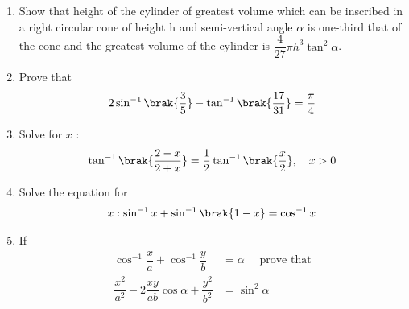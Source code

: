 \begin{enumerate}
    \item Show that height of the cylinder of greatest volume which can be inscribed in a right circular cone of height h and semi-vertical angle $\alpha$ is one-third that of the cone and the greatest volume of the cylinder is $\dfrac{4}{27} \pi h^3 \tan^2 \alpha$.
    \item Prove that
          \begin{align*}
              2\sin^{-1}\brak{\dfrac{3}{5}}-\tan^{-1}\brak{\dfrac{17}{31}}=\dfrac{\pi}{4}
          \end{align*}
    \item Solve for $x$ :
          \begin{align*}
              \tan^{-1}\brak{\dfrac{2-x}{2+x}}=\dfrac{1}{2} \tan^{-1}\brak{\dfrac{x}{2}},\quad x>0
          \end{align*}

    \item Solve the equation for
          \begin{align*}
              x: \sin^{-1} x + \sin^{-1}\brak{1-x} = \cos^{-1}x
          \end{align*}
    \item If
          \begin{align*}
              \cos^{-1}\dfrac{x}{a} + \cos^{-1}\dfrac{y}{b}                   & = \alpha \quad \text{ prove that} \\
              \dfrac{x^2}{a^2} -2\dfrac{xy}{ab}\cos \alpha + \dfrac{y^2}{b^2} & = \sin^2 \alpha
          \end{align*}
\end{enumerate}